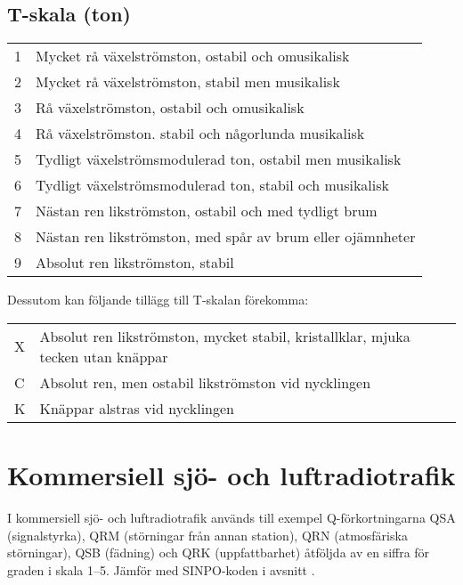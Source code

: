 \subsection{T-skala (ton)}

\begin{tabular}{p{}p{}}
1 & Mycket rå växelströmston, ostabil och omusikalisk \\
2 & Mycket rå växelströmston, stabil men musikalisk \\
3 & Rå växelströmston, ostabil och omusikalisk \\
4 & Rå växelströmston. stabil och någorlunda musikalisk \\
5 & Tydligt växelströmsmodulerad ton, ostabil men musikalisk \\
6 & Tydligt växelströmsmodulerad ton, stabil och musikalisk \\
7 & Nästan ren likströmston, ostabil och med tydligt brum \\
8 & Nästan ren likströmston, med spår av brum eller ojämnheter \\
9 & Absolut ren likströmston, stabil \\
\end{tabular}

\smallskip
\noindent Dessutom kan följande tillägg till T-skalan förekomma:

\smallskip

\noindent\begin{tabular}{p{}p{}}
  X & Absolut ren likströmston, mycket stabil, kristallklar, mjuka tecken utan
      knäppar \\
C & Absolut ren, men ostabil likströmston vid nycklingen \\
K & Knäppar alstras vid nycklingen \\
\end{tabular}

\section{Kommersiell sjö- och luftradiotrafik}

I kommersiell sjö- och luftradiotrafik används till exempel Q-förkortningarna
QSA (signalstyrka), QRM (störningar från annan station), QRN
(atmosfäriska störningar), QSB (fädning) och QRK (uppfattbarhet)
åtföljda av en siffra för graden i skala 1--5. Jämför med SINPO-koden
i avsnitt .

